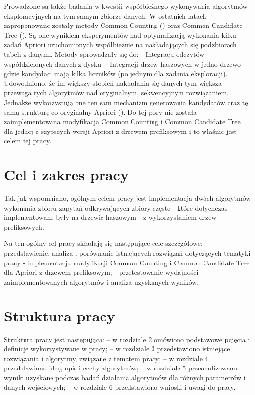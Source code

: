 Prowadzone są także badania w kwestii współbieżnego wykonywania algorytmów eksploracyjnych na tym samym zbiorze danych. W ostatnich latach zaproponowane zostały metody Common Counting (\cite{WojciechowskiCC}) oraz Common Candidate Tree (\cite{WojciechowskiCCT}). Są one wynikiem eksperymentów nad optymalizacją wykonania kilku zadań Apriori uruchomionych współbieżnie na nakładających się podzbiorach tabeli z danymi. Metody sprowadzały się do:\newline
- Integracji odczytów współdzielonych danych z dysku;\newline
- Integracji drzew haszowych w jedno drzewo gdzie kandydaci mają kilka liczników (po jednym dla zadania eksploracji).\newline
Udowodniono, że im większy stopień nakładania się danych tym większa przewaga tych algorytmów nad oryginalnym, sekwencyjnym rozwiązaniem. Jednakże wykorzystują one ten sam mechanizm generowania kandydatów oraz tę samą strukturę co oryginalny Apriori (\cite{Agrawal}). Do tej pory nie została zaimplementowana modyfikacja Common Counting i Common Candidate Tree dla jednej z szybszych wersji Apriori z drzewem prefiksowym i to właśnie jest celem tej pracy. 

\section{Cel i zakres pracy}
\label{c12}

Tak jak wspomniano, ogólnym celem pracy jest implementacja dwóch algorytmów wykonania zbioru zapytań odkrywających zbiory częste - które dotychczas implementowane były na drzewie haszowym - z wykorzystaniem drzew prefiksowych.

Na ten ogólny cel pracy składają się następujące cele szczegółowe:\newline
- przedstawienie, analiza i porównanie istniejących rozwiązań dotyczących tematyki pracy\newline
- implementacja modyfikacji Common Counting i Common Candidate Tree dla Apriori z drzewem prefiksowym;\newline
- przetestowanie wydajności zaimplementowanych algorytmów i analiza uzyskanych wyników.
	
\section{Struktura pracy}
\label{c14}   
Struktura pracy jest następująca:\newline
-- w rozdziale 2 omówiono podstawowe pojęcia i definicje wykorzystywane w pracy;\newline
-- w rozdziale 3 przedstawiono istniejące rozwiązania i algorytmy, związane z tematem pracy;\newline
-- w rozdziale 4 przedstawiono ideę, opis i cechy algorytmów;\newline
-- w rozdziale 5 przeanalizowano wyniki uzyskane podczas badań działania algorytmów dla różnych parametrów i danych wejściowych;\newline
-- w rozdziale 6 przedstawiono wnioski i uwagi do pracy.